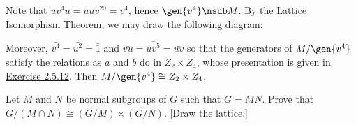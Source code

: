 \begin{sol}
    Note that $uv^4u = uuv^{20} = v^4$, hence $\gen{v^4} \nsub M$. By the Lattice Isomorphism Theorem, we may draw the following diagram:
    \begin{center}
    \end{center}
    Moreover, $\bar{v^4} = \bar{u^2} = \bar 1$ and $\bar{vu} = \bar{uv^5} = \bar{uv}$ so that the generators of $M/\gen{v^4}$ satisfy the relations as $a$ and $b$ do in $Z_2 \times Z_4$, whose presentation is given in \hyperref[ex2.5.12]{Exercise 2.5.12}. Then $M/\gen{v^4} \cong Z_2 \times Z_4$.
\end{sol}

\newpage

\begin{exercise}\label{ex3.3.7}
    Let $M$ and $N$ be normal subgroups of $G$ such that $G = MN$. Prove that $G/(M \cap N) \cong (G/M) \times (G/N)$. [Draw the lattice.]
\end{exercise}

